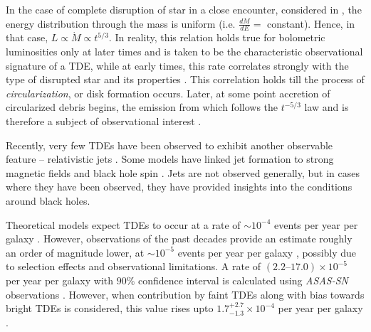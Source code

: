 \documentclass{tda}
\begin{document}
\noindent In the case of complete disruption of star in a close encounter, considered in \cite{evans_tidal_1989, lodato_stellar_2009}, the energy distribution through the mass is uniform (i.e. \(\frac{dM}{dE} = \) constant). Hence, in that case, \(L \propto \dot{M} \propto t^{5/3}\). In reality, this relation holds true for bolometric luminosities only at later times \cite{lodato_stellar_2009, lodato_multiband_2011} and is taken to be the characteristic observational signature of a TDE, while at early times, this rate correlates strongly with the type of disrupted star and its properties \cite{lodato_stellar_2009, lodato_recent_2015, guillochon_hydrodynamical_2013}. This correlation holds till the process of \emph{circularization}, or disk formation occurs. Later, at some point accretion of circularized debris begins, the emission from which follows the \(t^{-5/3}\) law and is therefore a subject of observational interest \cite{piran_disk_2015}.

Recently, very few TDEs have been observed to exhibit another observable feature -- relativistic jets \cite{lodato_recent_2015}. Some models have linked jet formation to strong magnetic fields and black hole spin \cite{dai_unified_2018}. Jets are not observed generally, but in cases where they have been observed, they have provided insights into the conditions around black holes.

Theoretical models expect TDEs to occur at a rate of \(\sim 10^{-4}\) events per year per galaxy \cite{magorrian_rates_1999}. However, observations of the past decades provide an estimate roughly an order of magnitude lower, at \(\sim 10^{-5}\) events per year per galaxy \cite{stone_rates_2016}, possibly due to selection effects and observational limitations. A rate of \((2.2–17.0) \times 10^{−5}\) per year per galaxy with \(90\%\) confidence interval is calculated using \textit{ASAS-SN} observations \cite{holoien_six_2016}. However, when contribution by faint TDEs along with bias towards bright TDEs is considered, this value rises upto \(1.7_{-1.3}^{+2.7} \times 10^{-4}\) per year per galaxy \cite{hung_sifting_2018}. 
\end{document}
